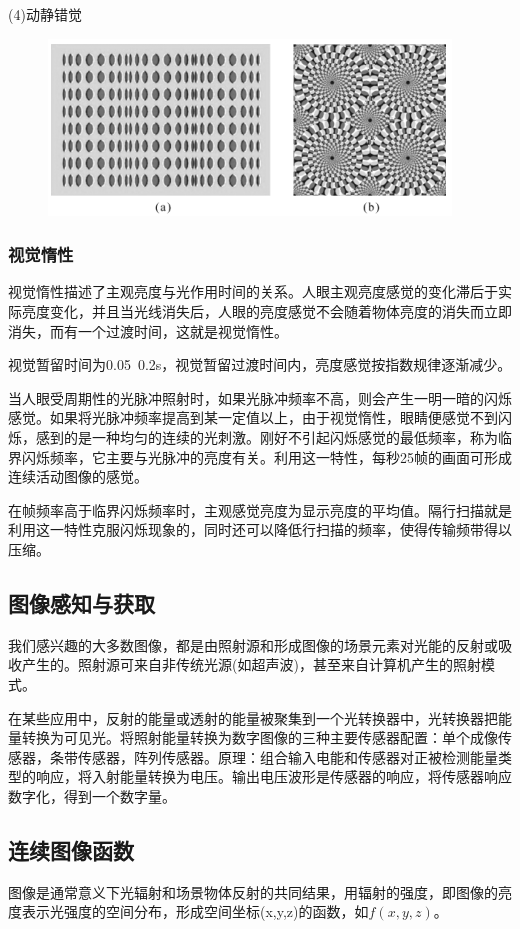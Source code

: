 \documentclass[11pt]{article}
\begin{document}
(4)动静错觉
\begin{figure}[H]
	\centering
	\includegraphics[scale=0.5]{10}
\end{figure}
\subsubsection{视觉惰性}
视觉惰性描述了主观亮度与光作用时间的关系。人眼主观亮度感觉的变化滞后于实际亮度变化，并且当光线消失后，人眼的亮度感觉不会随着物体亮度的消失而立即消失，而有一个过渡时间，这就是视觉惰性。

视觉暂留时间为0.05~0.2s，视觉暂留过渡时间内，亮度感觉按指数规律逐渐减少。

当人眼受周期性的光脉冲照射时，如果光脉冲频率不高，则会产生一明一暗的闪烁感觉。如果将光脉冲频率提高到某一定值以上，由于视觉惰性，眼睛便感觉不到闪烁，感到的是一种均匀的连续的光刺激。刚好不引起闪烁感觉的最低频率，称为临界闪烁频率，它主要与光脉冲的亮度有关。利用这一特性，每秒25帧的画面可形成连续活动图像的感觉。

在帧频率高于临界闪烁频率时，主观感觉亮度为显示亮度的平均值。隔行扫描就是利用这一特性克服闪烁现象的，同时还可以降低行扫描的频率，使得传输频带得以压缩。
\subsection{图像感知与获取}
我们感兴趣的大多数图像，都是由照射源和形成图像的场景元素对光能的反射或吸收产生的。照射源可来自非传统光源(如超声波)，甚至来自计算机产生的照射模式。

在某些应用中，反射的能量或透射的能量被聚集到一个光转换器中，光转换器把能量转换为可见光。将照射能量转换为数字图像的三种主要传感器配置：单个成像传感器，条带传感器，阵列传感器。原理：组合输入电能和传感器对正被检测能量类型的响应，将入射能量转换为电压。输出电压波形是传感器的响应，将传感器响应数字化，得到一个数字量。

\subsection{连续图像函数}
图像是通常意义下光辐射和场景物体反射的共同结果，用辐射的强度，即图像的亮度表示光强度的空间分布，形成空间坐标(x,y,z)的函数，如$f(x,y,z)$。
\end{document}
